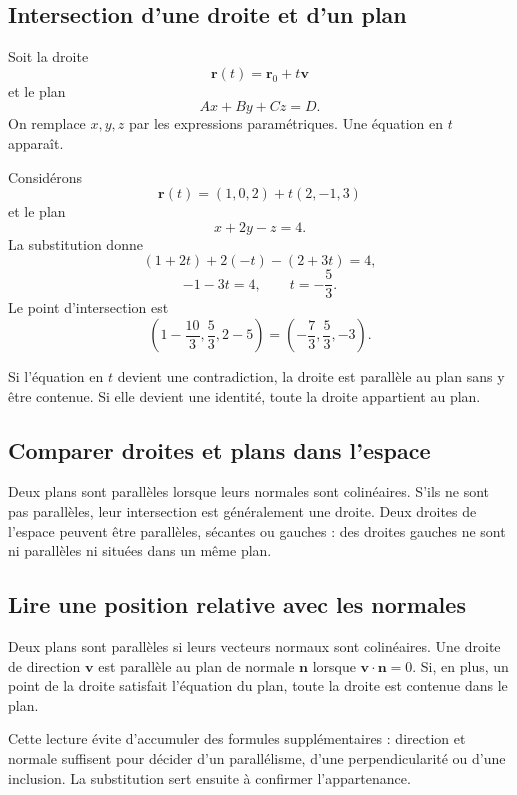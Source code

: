 \documentclass[12pt,a4paper,openany]{book}
\begin{document}
\subsection{Intersection d'une droite et d'un plan}

Soit la droite
\[
\mathbf r(t)=\mathbf r_0+t\mathbf v
\]
et le plan
\[
Ax+By+Cz=D.
\]
On remplace $x,y,z$ par les expressions paramétriques. Une équation en $t$ apparaît.

\begin{examplebox}
Considérons
\[
\mathbf r(t)=(1,0,2)+t(2,-1,3)
\]
et le plan
\[
x+2y-z=4.
\]
La substitution donne
\[
(1+2t)+2(-t)-(2+3t)=4,
\]
\[
-1-3t=4,
\qquad t=-\frac53.
\]
Le point d'intersection est
\[
\left(1-\frac{10}{3},\frac53,2-5\right)
=
\left(-\frac73,\frac53,-3\right).
\]
\end{examplebox}

Si l'équation en $t$ devient une contradiction, la droite est parallèle au plan sans y être contenue. Si elle devient une identité, toute la droite appartient au plan.

\subsection{Comparer droites et plans dans l'espace}

Deux plans sont parallèles lorsque leurs normales sont colinéaires. S'ils ne sont pas parallèles, leur intersection est généralement une droite. Deux droites de l'espace peuvent être parallèles, sécantes ou gauches : des droites gauches ne sont ni parallèles ni situées dans un même plan.

\subsection{Lire une position relative avec les normales}

Deux plans sont parallèles si leurs vecteurs normaux sont colinéaires. Une droite de direction $\mathbf v$ est parallèle au plan de normale $\mathbf n$ lorsque $\mathbf v\cdot\mathbf n=0$. Si, en plus, un point de la droite satisfait l'équation du plan, toute la droite est contenue dans le plan.

\begin{connectionbox}
Cette lecture évite d'accumuler des formules supplémentaires : direction et normale suffisent pour décider d'un parallélisme, d'une perpendicularité ou d'une inclusion. La substitution sert ensuite à confirmer l'appartenance.
\end{connectionbox}
\end{document}
